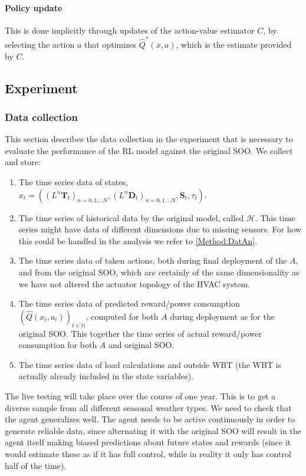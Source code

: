 \documentclass{article}
\theoremstyle{definition}
\theoremstyle{remark}
\newcommand{\N}{\mathbb{N}}
\begin{document}
\paragraph{Policy update}

This is done implicitly through updates of the action-value estimator $C$, by selecting the action $a$ that optimizes $\hat Q^*(x,a)$, which is the estimate provided by $C$. 

\subsection{Experiment}
\subsubsection{Data collection} \label{Method:DatC}
This section describes the data collection in the experiment that is necessary to evaluate the performance of the RL model against the original SOO. We collect and store:

\begin{enumerate}
\item The time series data of states, ${x_t = ((L^n\textbf{T}_t)_{n=0,1,..N}, (L^n\textbf{D}_t)_{n=0,1,..N}, \textbf{S}_t, \tau_t)}$.
\item The time series of historical data by the original model, called $\mathcal{H}$. This time series might have data of different dimensions due to missing sensors. For how this could be handled in the analysis we refer to \ref{Method:DatAn}.
\item The time series data of taken actions, both during final deployment of the $A$, and from the original SOO, which are certainly of the same dimensionality as we have not altered the actuator topology of the HVAC system.
\item The time series data of predicted reward/power consumption $(\hat Q(x_t,a_t))_{t\in\N}$, computed for both $A$ during deployment as for the original SOO. This together the time series of actual reward/power consumption for both $A$ and original SOO.
\item The time series data of load calculations and outside WBT (the WBT is actually already included in the state variables).
\end{enumerate}

The live testing will take place over the course of one year. This is to get a diverse sample from all different seasonal weather types. We need to check that the agent generalizes well. The agent needs to be active continuously in order to generate reliable data, since alternating it with the original SOO will result in the agent itself making biased predictions about future states and rewards (since it would estimate these as if it has full control, while in reality it only has control half of the time).
\end{document}
